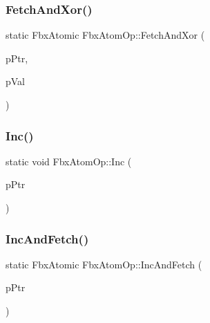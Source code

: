 \mbox{\label{class_fbx_atom_op_a45474ae63424456067d8ac4cb731bc5b}} 
\subsubsection{\texorpdfstring{Fetch\+And\+Xor()}{FetchAndXor()}}
{\footnotesize\ttfamily static Fbx\+Atomic Fbx\+Atom\+Op\+::\+Fetch\+And\+Xor (\begin{DoxyParamCaption}\item[{volatile Fbx\+Atomic $\ast$}]{p\+Ptr,  }\item[{Fbx\+Atomic}]{p\+Val }\end{DoxyParamCaption})\hspace{0.3cm}{\ttfamily [static]}}

\mbox{\label{class_fbx_atom_op_a8eb5901c61891a6203d2ac10e139fd37}} 
\subsubsection{\texorpdfstring{Inc()}{Inc()}}
{\footnotesize\ttfamily static void Fbx\+Atom\+Op\+::\+Inc (\begin{DoxyParamCaption}\item[{volatile Fbx\+Atomic $\ast$}]{p\+Ptr }\end{DoxyParamCaption})\hspace{0.3cm}{\ttfamily [static]}}

\mbox{\label{class_fbx_atom_op_a520fde374ed92377de404b020363d440}} 
\subsubsection{\texorpdfstring{Inc\+And\+Fetch()}{IncAndFetch()}}
{\footnotesize\ttfamily static Fbx\+Atomic Fbx\+Atom\+Op\+::\+Inc\+And\+Fetch (\begin{DoxyParamCaption}\item[{volatile Fbx\+Atomic $\ast$}]{p\+Ptr }\end{DoxyParamCaption})\hspace{0.3cm}{\ttfamily [static]}}


